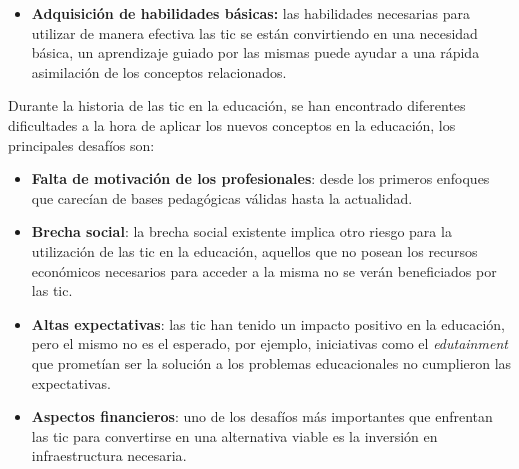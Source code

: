 \begin{itemize}
\item \textbf{Adquisición de habilidades básicas:} las habilidades necesarias para
    utilizar de manera efectiva las \Gls{tic} se están convirtiendo en una
    necesidad básica, un aprendizaje guiado por las mismas puede ayudar a una
    rápida asimilación de los conceptos relacionados\cite{martin2008modelo}.

\end{itemize}

Durante la historia de las \Gls{tic} en la educación, se han encontrado
diferentes dificultades a la hora de aplicar los nuevos conceptos en la educación, los principales desafíos son:


\begin{itemize}

\item \textbf{Falta de motivación de los profesionales}: desde los primeros enfoques que carecían de bases pedagógicas válidas
hasta la actualidad\cite{punie:ict,ict:romeo}.

\item \textbf{Brecha social}: la brecha social existente implica otro riesgo para la utilización de las \Gls{tic} en la educación, aquellos que no posean los recursos económicos necesarios para acceder a la misma no se verán beneficiados por las \Gls{tic}\cite{punie:ict}.

\item \textbf{Altas expectativas}: las \Gls{tic} han tenido un impacto positivo en la educación, pero el mismo no es el esperado\cite{punie:ict}, por ejemplo, iniciativas como el \emph{edutainment} que prometían ser la solución a los problemas educacionales no cumplieron las expectativas. 

\item \textbf{Aspectos financieros}: uno de los desafíos más importantes que enfrentan las \Gls{tic} para convertirse en una alternativa viable es la inversión en infraestructura necesaria\cite{unesco:ict}.

%

\end{itemize}

